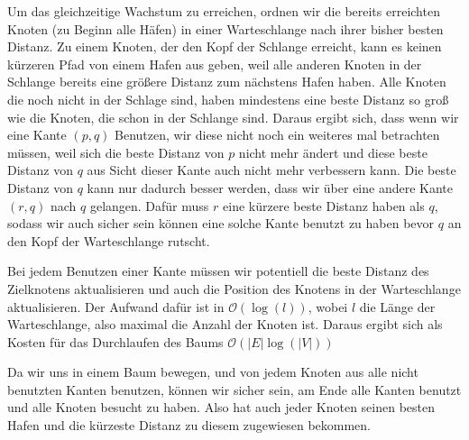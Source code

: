 \documentclass[parskip=half,a4paper]{scrartcl}
\begin{document}
Um das gleichzeitige Wachstum zu erreichen, ordnen wir die bereits erreichten Knoten (zu Beginn alle Häfen) in einer Warteschlange nach ihrer bisher besten Distanz. Zu einem Knoten, der den Kopf der Schlange erreicht, kann es keinen kürzeren Pfad von einem Hafen aus geben, weil alle anderen Knoten in der Schlange bereits eine grö{\ss}ere Distanz zum nächstens Hafen haben. Alle Knoten die noch nicht in der Schlage sind, haben mindestens eine beste Distanz so gro{\ss} wie die Knoten, die schon in der Schlange sind. Daraus ergibt sich, dass wenn wir eine Kante $(p,q)$ Benutzen, wir diese nicht noch ein weiteres mal betrachten müssen, weil sich die beste Distanz von $p$ nicht mehr ändert und diese beste Distanz von $q$ aus Sicht dieser Kante auch nicht mehr verbessern kann. Die beste Distanz von $q$ kann nur dadurch besser werden, dass wir über eine andere Kante $(r,q)$ nach $q$ gelangen. Dafür muss $r$ eine kürzere beste Distanz haben als $q$, sodass wir auch sicher sein können eine solche Kante benutzt zu haben bevor $q$ an den Kopf der Warteschlange rutscht.

Bei jedem Benutzen einer Kante müssen wir potentiell die beste Distanz des Zielknotens aktualisieren und auch die Position des Knotens in der Warteschlange aktualisieren. Der Aufwand dafür ist in \(\mathcal{O}(\log(l))\), wobei $l$ die Länge der Warteschlange, also maximal die Anzahl der Knoten ist. Daraus ergibt sich als Kosten für das Durchlaufen des Baums \(\mathcal{O}(|E|\log(|V|))\)

Da wir uns in einem Baum bewegen, und von jedem Knoten aus alle nicht benutzten Kanten benutzen, können wir sicher sein, am Ende alle Kanten benutzt und alle Knoten besucht zu haben. Also hat auch jeder Knoten seinen besten Hafen und die kürzeste Distanz zu diesem zugewiesen bekommen.
\end{document}
